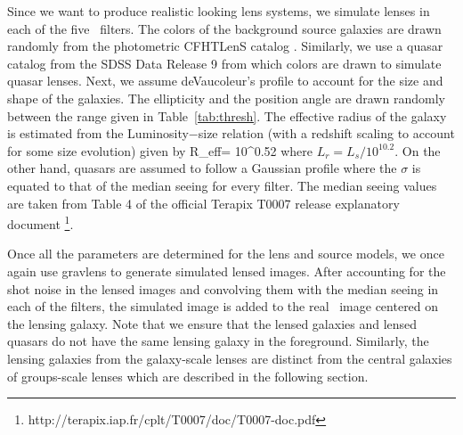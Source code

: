 \documentclass[useAMS,usenatbib,a4paper]{mn2e}
\begin{document}
Since we want to produce realistic looking lens systems, we simulate lenses in
each of the five \cfhtls~filters. The colors of the background source galaxies are drawn
randomly from the photometric CFHTLenS catalog
\citep{Hildebrandt2012,Erben2013}.  Similarly, we use a quasar catalog from the
SDSS Data Release 9 \citep{Paris2012} from which colors are drawn to simulate
quasar lenses. Next, we assume deVaucoleur's profile to account for the size
and shape of the galaxies. The ellipticity and the position angle are drawn
randomly between the range given in Table~\ref{tab:thresh}. The effective
radius of the galaxy is estimated from the Luminosity$-$size relation
\citep{Bernardi2003} (with a redshift scaling to account for some size
evolution) given by
\be
R_{\rm eff}= 10^{0.52} 
\ee
where $L_r=L_s/10^{10.2}$. On the other hand, quasars are assumed to follow a
Gaussian profile where the $\sigma$ is equated to that of the median seeing for
every filter. The median seeing values are taken from Table 4 of the official
Terapix T0007 release explanatory document \footnote{
    http://terapix.iap.fr/cplt/T0007/doc/T0007-doc.pdf}.

Once all the parameters are determined for the lens and source models, we once
again use {\sc gravlens} to generate simulated lensed images.  After accounting for the shot
noise in the lensed images and convolving them with the median seeing in each of
the filters, the simulated image is added to the real \cfhtls~image centered
on the lensing galaxy. Note that we ensure that the lensed galaxies and
lensed quasars do not have the same lensing galaxy in the foreground. Similarly,
the lensing galaxies from the galaxy-scale lenses are distinct from the central
galaxies of groups-scale lenses which are described in the following section.
\end{document}
